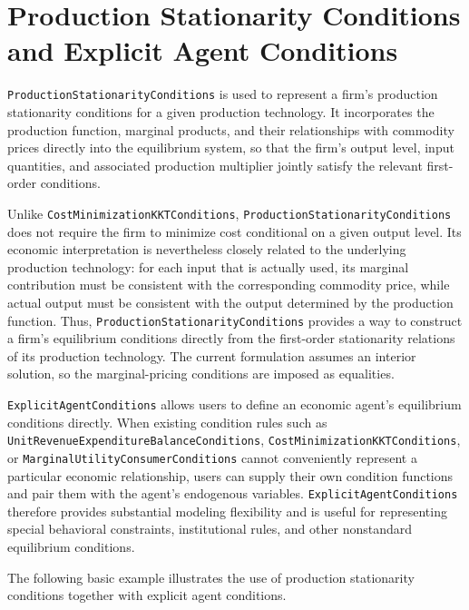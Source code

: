 \documentclass[
  letterpaper,
  DIV=11,
  numbers=noendperiod]{scrreprt}
\begin{document}
\begin{codelisting}
{}

\end{codelisting}%

\section{Production Stationarity Conditions and Explicit Agent
Conditions}\label{production-stationarity-conditions-and-explicit-agent-conditions}

\texttt{ProductionStationarityConditions} is used to represent a firm's
production stationarity conditions for a given production technology. It
incorporates the production function, marginal products, and their
relationships with commodity prices directly into the equilibrium
system, so that the firm's output level, input quantities, and
associated production multiplier jointly satisfy the relevant
first-order conditions.

Unlike \texttt{CostMinimizationKKTConditions},
\texttt{ProductionStationarityConditions} does not require the firm to
minimize cost conditional on a given output level. Its economic
interpretation is nevertheless closely related to the underlying
production technology: for each input that is actually used, its
marginal contribution must be consistent with the corresponding
commodity price, while actual output must be consistent with the output
determined by the production function. Thus,
\texttt{ProductionStationarityConditions} provides a way to construct a
firm's equilibrium conditions directly from the first-order stationarity
relations of its production technology. The current formulation assumes
an interior solution, so the marginal-pricing conditions are imposed as
equalities.

\texttt{ExplicitAgentConditions} allows users to define an economic
agent's equilibrium conditions directly. When existing condition rules
such as \texttt{UnitRevenueExpenditureBalanceConditions},
\texttt{CostMinimizationKKTConditions}, or
\texttt{MarginalUtilityConsumerConditions} cannot conveniently represent
a particular economic relationship, users can supply their own condition
functions and pair them with the agent's endogenous variables.
\texttt{ExplicitAgentConditions} therefore provides substantial modeling
flexibility and is useful for representing special behavioral
constraints, institutional rules, and other nonstandard equilibrium
conditions.

The following basic example illustrates the use of production
stationarity conditions together with explicit agent conditions.
\end{document}
